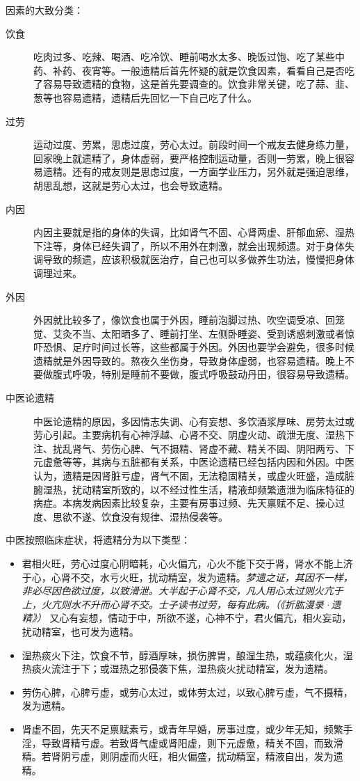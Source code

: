 因素的大致分类：\begin{description}
    \item[饮食] 吃肉过多、吃辣、喝酒、吃冷饮、睡前喝水太多、晚饭过饱、吃了某些中药、补药、夜宵等。一般遗精后首先怀疑的就是饮食因素，看看自己是否吃了容易导致遗精的食物，这是首先要调查的。饮食非常关键，吃了蒜、韭、葱等也容易遗精，遗精后先回忆一下自己吃了什么。
    \item[过劳] 运动过度、劳累，思虑过度，劳心太过。前段时间一个戒友去健身练力量，回家晚上就遗精了，身体虚弱，要严格控制运动量，否则一劳累，晚上很容易遗精。还有的戒友则是思虑过度，一方面学业压力，另外就是强迫思维，胡思乱想，这就是劳心太过，也会导致遗精。
    \item[内因] 内因主要就是指的身体的失调，比如肾气不固、心肾两虚、肝郁血瘀、湿热下注等，身体已经失调了，所以不用外在刺激，就会出现频遗。对于身体失调导致的频遗，应该积极就医治疗，自己也可以多做养生功法，慢慢把身体调理过来。
    \item[外因] 外因就比较多了，像饮食也属于外因，睡前泡脚过热、吹空调受凉、回笼觉、艾灸不当、太阳晒多了、睡前打坐、左侧卧睡姿、受到诱惑刺激或者惊吓恐惧、足疗时间过长等，这些都属于外因。外因也要学会避免，很多时候遗精就是外因导致的。熬夜久坐伤身，导致身体虚弱，也容易遗精。晚上不要做腹式呼吸，特别是睡前不要做，腹式呼吸鼓动丹田，很容易导致遗精。
    \item[中医论遗精] 中医论遗精的原因，多因情志失调、心有妄想、多饮酒浆厚味、房劳太过或劳心引起。主要病机有心神浮越、心肾不交、阴虚火动、疏泄无度、湿热下注、扰乱肾气、劳伤心脾、气不摄精、肾虚不藏、精关不固、阴阳两亏、下元虚惫等等，其病与五脏都有关系，中医论遗精已经包括内因和外因。中医认为，遗精是因肾脏亏虚，肾气不固，无法稳固精关，或虚火旺盛，造成脏腑湿热，扰动精室所致的，以不经过性生活，精液却频繁遗泄为临床特征的病症。本病发病因素比较复杂，主要有房事过频、先天禀赋不足、操心过度、思欲不遂、饮食没有规律、湿热侵袭等。
\end{description}

中医按照临床症状，将遗精分为以下类型：\begin{itemize}
    \item 君相火旺，劳心过度心阴暗耗，心火偏亢，心火不能下交于肾，肾水不能上济于心，心肾不交，水亏火旺，扰动精室，发为遗精。\textit{梦遗之证，其因不一样，非必尽因色欲过度，以致滑泄。大半起于心肾不交，凡人用心太过则火亢于上，火亢则水不升而心肾不交。士子读书过劳，每有此病。（《折肱漫录·遗精》）} 又心有妄想，情动于中，所欲不遂，心神不宁，君火偏亢，相火妄动，扰动精室，也可发为遗精。
    \item 湿热痰火下注，饮食不节，醇酒厚味，损伤脾胃，酿湿生热，或蕴痰化火，湿热痰火流注于下；或湿热之邪侵袭下焦，湿热痰火扰动精室，发为遗精。
    \item 劳伤心脾，心脾亏虚，或劳心太过，或体劳太过，以致心脾亏虚，气不摄精，发为遗精。
    \item 肾虚不固，先天不足禀赋素亏，或青年早婚，房事过度，或少年无知，频繁手淫，导致肾精亏虚。若致肾气虚或肾阳虚，则下元虚惫，精关不固，而致滑精。若肾阴亏虚，则阴虚而火旺，相火偏盛，扰动精室，精液自出，发为遗精。
\end{itemize}

